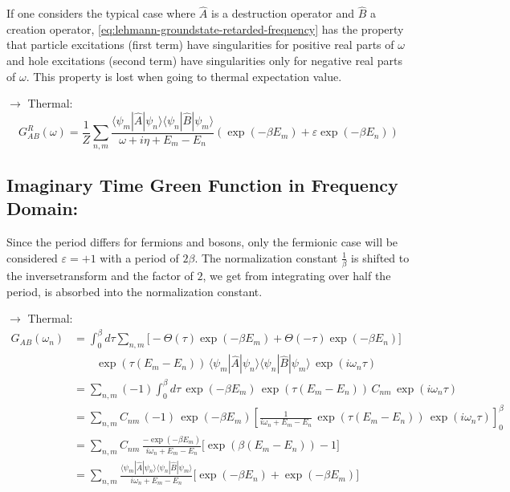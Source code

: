 If one considers the typical case where $\hat{A}$ is a destruction operator and $\hat{B}$ a creation operator, \eqref{eq:lehmann-groundstate-retarded-frequency} has the property that particle excitations (first term) have singularities for positive real parts of $\omega$ and hole excitations (second term) have singularities only for negative real parts of $\omega$. This property is lost when going to thermal expectation value.

$\rightarrow$ Thermal:
\begin{equation}
    \boxed{G^{R}_{AB}(\omega) = \frac{1}{Z} \sum_{n,m} \frac{\langle\psi_m| \hat{A} |\psi_n\rangle\langle\psi_n| \hat{B} |\psi_m\rangle}{\omega + i\eta + E_m - E_n} \left( \exp(-\beta E_m) + \varepsilon \exp(-\beta E_n) \right)} \label{eq:lehmann-thermal-retarded-frequency}
\end{equation}

\subsection*{Imaginary Time Green Function in Frequency Domain:}

Since the period differs for fermions and bosons, only the fermionic case will be considered $\varepsilon = +1$ with a period of $2\beta$.
The normalization constant $\frac{1}{\beta}$ is shifted to the inversetransform and the factor of $2$, we get from integrating over half the period, is absorbed into the normalization constant.

$\rightarrow$ Thermal:
\begin{align*}
    G_{AB}(\omega_n) &= \int_0^{\beta} d\tau \sum_{n,m} \Big[ -\Theta(\tau)\exp(-\beta E_m) + \Theta(-\tau)\exp(-\beta E_n) \Big] \\
    &\qquad \exp(\tau(E_m - E_n))\, \langle\psi_m| \hat{A} |\psi_n\rangle\langle\psi_n| \hat{B} |\psi_m\rangle\, \exp(i\omega_n \tau) \\[1ex]
    &= \sum_{n,m} (-1) \int_0^{\beta} d\tau\, \exp(-\beta E_m)\, \exp(\tau(E_m - E_n))\, C_{nm}\, \exp(i\omega_n \tau) \\[1ex]
    &= \sum_{n,m} C_{nm}\, (-1)\, \exp(-\beta E_m) \left[ \frac{1}{i\omega_n + E_m - E_n}\, \exp(\tau(E_m - E_n))\, \exp(i\omega_n \tau) \right]_0^{\beta} \\[1ex]
    &= \sum_{n,m} C_{nm}\, \frac{-\exp(-\beta E_m)}{i\omega_n + E_m - E_n} \Big[ \exp(\beta(E_m - E_n)) - 1 \Big] \\[1ex]
    &= \sum_{n,m} \frac{\langle\psi_m| \hat{A} |\psi_n\rangle\langle\psi_n| \hat{B} |\psi_m\rangle}{i\omega_n + E_m - E_n} \Big[ \exp(-\beta E_n) + \exp(-\beta E_m) \Big]
\end{align*}

